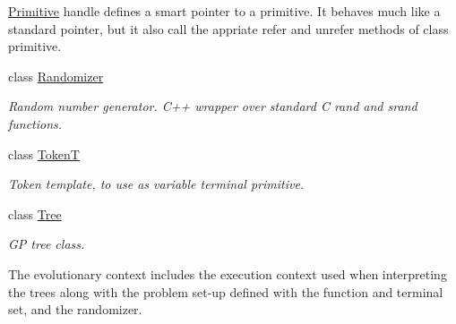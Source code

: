 \begin{DoxyCompactItemize}
\begin{DoxyCompactList}
\hyperlink{classPuppy_1_1Primitive}{Primitive} handle defines a smart pointer to a primitive. It behaves much like a standard pointer, but it also call the appriate refer and unrefer methods of class primitive. \end{DoxyCompactList}\item 
class \hyperlink{classPuppy_1_1Randomizer}{Randomizer}
\begin{DoxyCompactList}\small\item\em Random number generator. C++ wrapper over standard C rand and srand functions. \end{DoxyCompactList}\item 
class \hyperlink{classPuppy_1_1TokenT}{Token\+T}
\begin{DoxyCompactList}\small\item\em Token template, to use as variable terminal primitive. \end{DoxyCompactList}\item 
class \hyperlink{classPuppy_1_1Tree}{Tree}
\begin{DoxyCompactList}\small\item\em G\+P tree class.

The evolutionary context includes the execution context used when interpreting the trees along with the problem set-\/up defined with the function and terminal set, and the randomizer. \end{DoxyCompactList}\end{DoxyCompactItemize}
